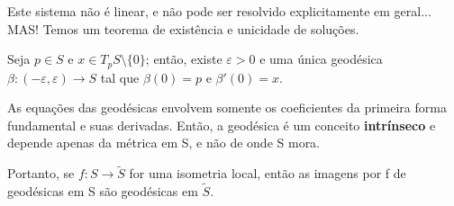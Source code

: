 \documentclass[../differential_geometry.tex]{subfiles}
\begin{document}
Este sistema não é linear, e não pode ser resolvido explicitamente em geral... MAS! Temos um teorema de existência e unicidade de soluções.
\begin{theorem*}
	Seja \(p\in S\) e \(x\in T_{p}S\setminus{\{0\}}\); então, existe \(\varepsilon > 0\) e uma única geodésica \(\beta :(-\varepsilon , \varepsilon )\rightarrow S\) tal que \(\beta (0) = p\) e \(\beta '(0) = x\).
\end{theorem*}
\begin{tcolorbox}[
		skin=enhanced,
		title=Observação,
		fonttitle=\bfseries,
		colframe=black,
		colbacktitle=cyan!75!white,
		colback=cyan!15,
		colbacklower=black,
		coltitle=black,
		drop fuzzy shadow,
	]
	As equações das geodésicas envolvem somente os coeficientes da primeira forma fundamental e suas derivadas. Então, a geodésica é um conceito \textbf{intrínseco} e depende apenas da métrica em S, e não de onde S mora.

	Portanto, se \(f:S\rightarrow \tilde{S}\) for uma isometria local, então as imagens por f de geodésicas em S são geodésicas em \(\tilde{S}\).
\end{tcolorbox}
\end{document}
